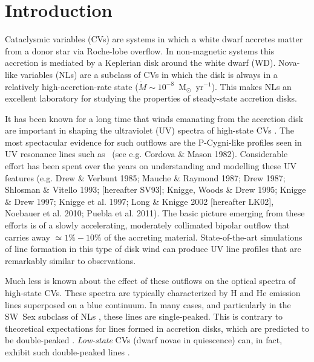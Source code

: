 \documentclass[preprint, a4paper, 11pt]{aastex}
\begin{document}
\maketitle


%
%

\section{Introduction} 
\label{sec:intro}

Cataclysmic variables (CVs) are systems in which a white dwarf
accretes matter from a donor star via Roche-lobe overflow. In
non-magnetic systems this accretion is mediated by a Keplerian disk
around the white dwarf (WD). Nova-like variables (NLs) are a subclass
of CVs in which the  disk is always in a relatively
high-accretion-rate state ($\dot{M} \sim
10^{-8}$~M$_{\odot}$~yr$^{-1}$).  This makes NLs an excellent
laboratory for studying the properties of steady-state accretion
disks.

It has been known for a long time that winds emanating from the
accretion disk are important in shaping the ultraviolet (UV) spectra
of high-state CVs \citep{heap1978, greensteinoke1982}. The most spectacular evidence for such
outflows are the P-Cygni-like profiles seen in UV resonance lines such as
\civfull\ (see e.g. Cordova \& Mason
1982\nocite{cordova1982}). Considerable effort has been spent over the
years on understanding and modelling these UV features (e.g. Drew \&
Verbunt 1985\nocite{drewverbunt1985}; Mauche \& Raymond
1987\nocite{maucheraymond1987}; Drew 1987; Shlosman \& Vitello 1993; [hereafter
SV93]\nocite{SV93}; Knigge, Woods \& Drew 1995\nocite{KWD95}; 
Knigge \& Drew 1997\nocite{kd1997}; 
Knigge et al. 1997\nocite{knigge1997}; Long \& Knigge 2002 [hereafter LK02]\nocite{LK02}, 
Noebauer et al. 2010\nocite{noebauer};
Puebla et al. 2011\nocite{puebla2011}). The basic picture emerging from these efforts is
of a slowly accelerating, moderately collimated bipolar
outflow that carries away $\simeq 1\% - 10\%$ of the accreting
material. State-of-the-art simulations of line formation in this type
of disk wind can produce UV line profiles that are remarkably similar
to observations.

Much less is known about the effect of these outflows on the optical
spectra of high-state CVs. These spectra are typically characterized
by H and He emission lines superposed on a blue continuum. In many
cases, and particularly in the SW~Sex subclass of NLs
\citep{HSK86,DR95}, these lines are single-peaked. This is contrary to
theoretical expectations for lines formed in accretion disks, which
are predicted to be double-peaked \citep{smak1981, hornemarsh1986}. 
{\em Low-state} CVs (dwarf novae in quiescence) can, in fact,
exhibit such double-peaked lines \citep{marshhorne1990}. 
\end{document}
